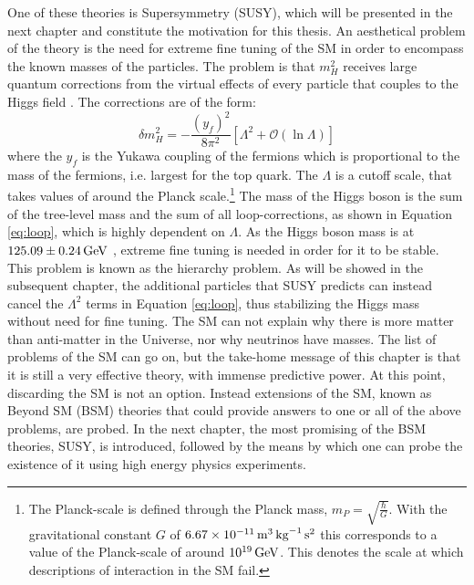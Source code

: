 One of these theories is Supersymmetry (SUSY), which will be presented in the next chapter and constitute the motivation for this thesis. 
\newpara
\noindent\justify
An aesthetical problem of the theory is the need for extreme fine tuning of the SM in order to encompass the known masses of the particles. 
The problem is that $m_{H}^{2}$ receives large quantum corrections from the virtual effects of every particle that couples to the Higgs field \cite{Martin:1997ns}. 
The corrections are of the form:
\begin{equation}
\delta m_{H}^{2}=-\frac{(y_{f})^{2}}{8\pi^{2}}\left[ \Lambda^{2} + \mathcal{O}\left(\ln\Lambda\right)\right] 
\label{eq:loop}
\end{equation}
where the $y_{f}$ is the Yukawa coupling of the fermions which is proportional to the mass of the fermions, i.e. largest for the top quark. 
The $\Lambda$ is a cutoff scale, that takes values of around the Planck scale.\footnote{The Planck-scale is defined through the Planck mass, $m_{P}=\sqrt{\frac{\hbar}{G}}$. With the gravitational constant $G$ of $6.67\times10^{-11}\,\text{m}^{3}\,\text{kg}^{-1}\,\text{s}^{2}$ this corresponds to a value of the Planck-scale of around $10^{19}\,\text{Ge\hspace{-.08em}V}$. This denotes the scale at which descriptions of interaction in the SM fail.} 
The mass of the Higgs boson is the sum of the tree-level mass and the sum of all loop-corrections, as shown in Equation \ref{eq:loop}, which is highly dependent on $\Lambda$. 
As the Higgs boson mass is at $125.09\pm0.24\,\text{Ge\hspace{-.08em}V}$ \cite{Olive_2016}, extreme fine tuning is needed in order for it to be stable. 
This problem is known as the hierarchy problem. 
As will be showed in the subsequent chapter, the additional particles that SUSY predicts can instead cancel the $\Lambda^{2}$ terms in Equation \ref{eq:loop}, thus stabilizing the Higgs mass without need for fine tuning.
\newpara
\noindent\justify
The SM can not explain why there is more matter than anti-matter in the Universe, nor why neutrinos have masses. 
The list of problems of the SM can go on, but the take-home message of this chapter is that it is still a very effective theory, with immense predictive power. 
At this point, discarding the SM is not an option. 
Instead extensions of the SM, known as Beyond SM (BSM) theories that could provide answers to one or all of the above problems, are probed. 
In the next chapter, the most promising of the BSM theories, SUSY, is introduced, followed by the means by which one can probe the existence of it using high energy physics experiments.  

